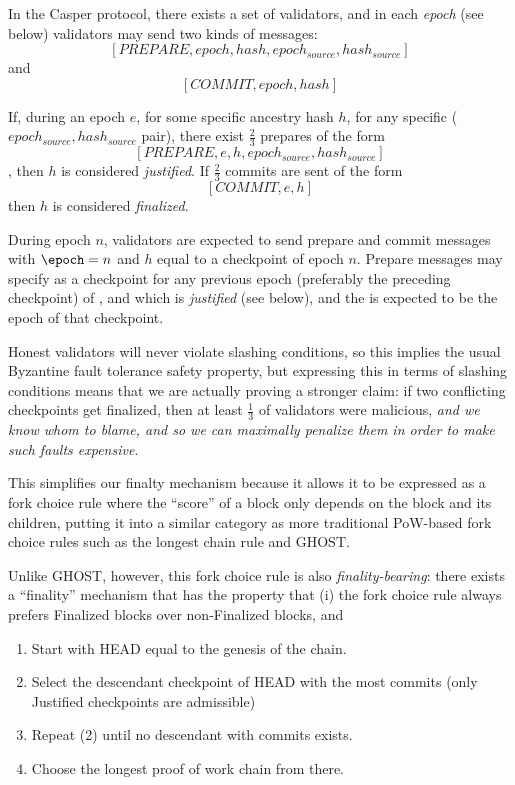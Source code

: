 In the Casper protocol, there exists a set of validators, and in each \textit{epoch} (see below) validators may send two kinds of messages: $$[PREPARE, epoch, hash, epoch_{source}, hash_{source}]$$ and $$[COMMIT, epoch, hash]$$


If, during an epoch $e$, for some specific ancestry hash $h$, for any specific ($epoch_{source}, hash_{source}$ pair), there exist $\frac{2}{3}$ prepares of the form $$[PREPARE, e, h, epoch_{source}, hash_{source}]$$, then $h$ is considered \textit{justified}. If $\frac{2}{3}$ commits are sent of the form $$[COMMIT, e, h]$$ then $h$ is considered \textit{finalized}.


During epoch $n$, validators are expected to send prepare and commit messages with $\epoch = n$ and $h$ equal to a checkpoint of epoch $n$. Prepare messages may specify as \hashsource a checkpoint for any previous epoch (preferably the preceding checkpoint) of \hash, and which is \textit{justified} (see below), and the \epochsource is expected to be the epoch of that checkpoint.


Honest validators will never violate slashing conditions, so this implies the usual Byzantine fault tolerance safety property, but expressing this in terms of slashing conditions means that we are actually proving a stronger claim: if two conflicting checkpoints get finalized, then at least $\frac{1}{3}$ of validators were malicious, \textit{and we know whom to blame, and so we can maximally penalize them in order to make such faults expensive}.


This simplifies our finalty mechanism because it allows it to be expressed as a fork choice rule where the ``score'' of a block only depends on the block and its children, putting it into a similar category as more traditional PoW-based fork choice rules such as the longest chain rule and GHOST\cite{sompolinsky2013accelerating}.

Unlike GHOST, however, this fork choice rule is also \textit{finality-bearing}: there exists a ``finality'' mechanism that has the property that (i) the fork choice rule always prefers Finalized blocks over non-Finalized blocks, and

\begin{enumerate}
\item Start with HEAD equal to the genesis of the chain.
\item Select the descendant checkpoint of HEAD with the most commits (only Justified checkpoints are admissible)
\item Repeat (2) until no descendant with commits exists.
\item Choose the longest proof of work chain from there.
\end{enumerate}


